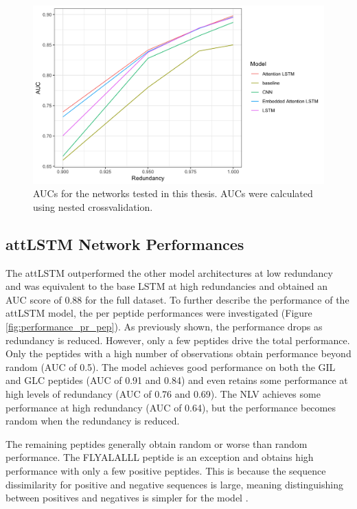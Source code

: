 \begin{figure}
    \centering
    \includegraphics[width=\linewidth]{figures/partition_performance.png}
    \caption{AUCs for the networks tested in this thesis. AUCs were calculated using nested crossvalidation.}
    \label{fig:redundancy_compare}
\end{figure}

\subsection{attLSTM Network Performances}

The attLSTM outperformed the other model architectures at low redundancy and was equivalent to the base LSTM at high redundancies and obtained an AUC score of 0.88 for the full dataset. To further describe the performance of the attLSTM model, the per peptide performances were investigated (Figure \ref{fig:performance_pr_pep}). As previously shown, the performance drops as redundancy is reduced. However, only a few peptides drive the total performance. Only the peptides with a high number of observations obtain performance beyond random (AUC of 0.5). The model achieves good performance on both the GIL and GLC peptides (AUC of 0.91 and 0.84) and even retains some performance at high levels of redundancy (AUC of 0.76 and 0.69). The NLV achieves some performance at high redundancy (AUC of 0.64), but the performance becomes random when the redundancy is reduced.

The remaining peptides generally obtain random or worse than random performance. The FLYALALLL peptide is an exception and obtains high performance with only a few positive peptides. This is because the sequence dissimilarity for positive and negative sequences is large, meaning distinguishing between positives and negatives is simpler for the model \cite{Montemurro2021NetTCR-2.0Data}.

